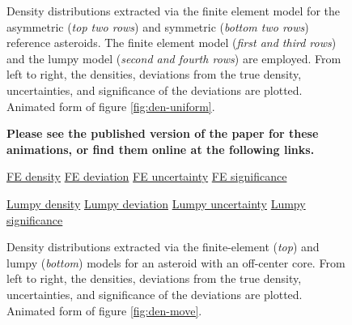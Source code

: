 \begin{figure}
  \caption{Density distributions extracted via the finite element model for the asymmetric (\textit{top two rows}) and symmetric (\textit{bottom two rows}) reference asteroids. The finite element model (\textit{first and third rows}) and the lumpy model (\textit{second and fourth rows}) are employed. From left to right, the densities, deviations from the true density, uncertainties, and significance of the deviations are plotted. Animated form of figure \ref{fig:den-uniform}.}
  \label{fig:animated-uniform}
\end{figure}

\begin{figure}
  \textbf{Please see the published version of the paper for these animations, or find them online at the following links.}

  \href{https://github.com/jack-dinsmore/asteroid-tidal-torque/tree/main/paper/gifs/move-fe-d.mp4}{FE density} \hfill
  \href{https://github.com/jack-dinsmore/asteroid-tidal-torque/tree/main/paper/gifs/move-fe-s.mp4}{FE deviation} \hfill
  \href{https://github.com/jack-dinsmore/asteroid-tidal-torque/tree/main/paper/gifs/move-fe-u.mp4}{FE uncertainty} \hfill
  \href{https://github.com/jack-dinsmore/asteroid-tidal-torque/tree/main/paper/gifs/move-fe-r.mp4}{FE significance}

  \href{https://github.com/jack-dinsmore/asteroid-tidal-torque/tree/main/paper/gifs/move-l-d.mp4}{Lumpy density} \hfill
  \href{https://github.com/jack-dinsmore/asteroid-tidal-torque/tree/main/paper/gifs/move-l-s.mp4}{Lumpy deviation} \hfill
  \href{https://github.com/jack-dinsmore/asteroid-tidal-torque/tree/main/paper/gifs/move-l-u.mp4}{Lumpy uncertainty} \hfill
  \href{https://github.com/jack-dinsmore/asteroid-tidal-torque/tree/main/paper/gifs/move-l-r.mp4}{Lumpy significance}

  \caption{Density distributions extracted via the finite-element (\textit{top}) and lumpy (\textit{bottom}) models for an asteroid with an off-center core. From left to right, the densities, deviations from the true density, uncertainties, and significance of the deviations are plotted. Animated form of figure \ref{fig:den-move}.}
  \label{fig:animated-move}
\end{figure}

